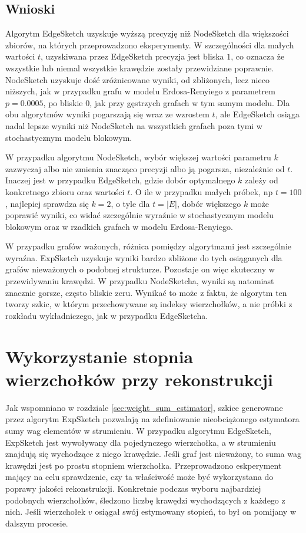     \subsection{Wnioski}
    Algorytm EdgeSketch uzyskuje wyższą precyzję niż NodeSketch dla większości zbiorów, na których przeprowadzono eksperymenty. W szczególności dla małych wartości $t$, uzyskiwana przez EdgeSketch precyzja jest bliska $1$, co oznacza że wszystkie lub niemal wszystkie krawędzie zostały przewidziane poprawnie. NodeSketch uzyskuje dość zróżnicowane wyniki, od zbliżonych, lecz nieco niższych, jak w przypadku grafu w modelu Erdosa-Renyiego z parametrem $p = 0.0005$, po bliskie $0$, jak przy gęstrzych grafach w tym samym modelu. Dla obu algorytmów wyniki pogarszają się wraz ze wzrostem $t$, ale EdgeSketch osiąga nadal lepsze wyniki niż NodeSketch na wszystkich grafach poza tymi w stochastycznym modelu blokowym. 
    
    W przypadku algorytmu NodeSketch, wybór większej wartości parametru $k$ zazwyczaj albo nie zmienia znacząco precyzji albo ją pogarsza, niezależnie od $t$. Inaczej jest w przypadku EdgeSketch, gdzie dobór optymalnego $k$ zależy od konkretnego zbioru oraz wartości $t$. O ile w przypadku małych próbek, np $t = 100$, najlepiej sprawdza się $k = 2$, o tyle dla $t = |E|$, dobór większego $k$ może poprawić wyniki, co widać szczególnie wyraźnie w stochastycznym modelu blokowym oraz w rzadkich grafach w modelu Erdosa-Renyiego. 

    W przypadku grafów ważonych, różnica pomiędzy algorytmami jest szczególnie wyraźna. ExpSketch uzyskuje wyniki bardzo zbliżone do tych osiąganych dla grafów nieważonych o podobnej strukturze. Pozostaje on więc skuteczny w przewidywaniu krawędzi. W przypadku NodeSketcha, wyniki są natomiast znacznie gorsze, często bliskie zeru. Wynikać to może z faktu, że algorytm ten tworzy szkic, w którym przechowywane są indeksy wierzchołków, a nie próbki z rozkładu wykładniczego, jak w przypadku EdgeSketcha.

\section{Wykorzystanie stopnia wierzchołków przy rekonstrukcji}
    Jak wspomniano w rozdziale \ref{sec:weight_sum_estimator}, szkice generowane przez algorytm ExpSketch pozwalają na zdefiniowanie nieobciążonego estymatora sumy wag elementów w strumieniu. W przypadku algorytmu EdgeSketch, ExpSketch jest wywoływany dla pojedynczego wierzchołka, a w strumieniu znajdują się wychodzące z niego krawędzie. Jeśli graf jest nieważony, to suma wag krawędzi jest po prostu stopniem wierzchołka. 
    Przeprowadzono eskperyment mający na celu sprawdzenie, czy ta właściwość może być wykorzystana do poprawy jakości rekonstrukcji. Konkretnie podczas wyboru najbardziej podobnych wierzchołków, śledzono liczbę krawędzi wychodzących z każdego z nich. Jeśli wierzchołek $v$ osiągał swój estymowany stopień, to był on pomijany w dalszym procesie.  
    
